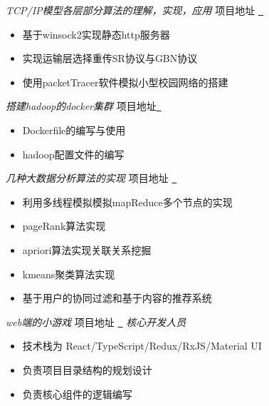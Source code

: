 \documentclass{uniquecv}
\begin{document}
{\it TCP/IP模型各层部分算法的理解，实现，应用}
项目地址 \quad \href{https://github.com/cheerryio/HHHHHHust-awful3/tree/network}{{\color{gray}{\faLink}}~}
\vspace{0.4ex}
\begin{itemize}
  \item 基于winsock2实现静态http服务器
  \item 实现运输层选择重传SR协议与GBN协议
  \item 使用packetTracer软件模拟小型校园网络的搭建
\end{itemize}

\textit{搭建hadoop的docker集群}
项目地址\quad \href{https://github.com/cheerryio/HHHHHHust-awful3/tree/dataprocess}{{\color{gray}{\faLink}}~}
\begin{itemize}
  \item Dockerfile的编写与使用
  \item hadoop配置文件的编写
\end{itemize}

{\it 几种大数据分析算法的实现}
项目地址 \quad \href{https://github.com/cheerryio/HHHHHHust-awful3/tree/datamining}{{\color{gray}{\faLink}}~}
\begin{itemize}
  \item 利用多线程模拟模拟mapReduce多个节点的实现
  \item pageRank算法实现
  \item apriori算法实现关联关系挖掘
  \item kmeans聚类算法实现
  \item 基于用户的协同过滤和基于内容的推荐系统
\end{itemize}

{\it web端的小游戏}
项目地址 \quad \href{https://github.com/cheerryio/HHHHHHust-awful3/tree/software}{{\color{gray}{\faLink}}~}
\quad \emph{核心开发人员}
\begin{itemize}
  \item 技术栈为 React/TypeScript/Redux/RxJS/Material UI
  \item 负责项目目录结构的规划设计
  \item 负责核心组件的逻辑编写
\end{itemize}
\end{document}
